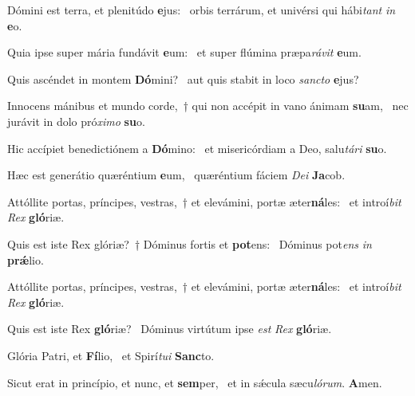 \item Dómini est terra, et plenitúdo \textbf{e}jus:~\psstar{} orbis terrárum, et univérsi qui hábi\textit{tant} \textit{in} \textbf{e}o.
\item Quia ipse super mária fundávit \textbf{e}um:~\psstar{} et super flúmina præpa\textit{rávit} \textbf{e}um.
\item Quis ascéndet in montem \textbf{Dó}mini?~\psstar{} aut quis stabit in loco \textit{sancto} \textbf{e}jus?
\item Innocens mánibus et mundo corde,~† qui non accépit in vano ánimam \textbf{su}am,~\psstar{} nec jurávit in dolo pró\textit{ximo} \textbf{su}o.
\item Hic accípiet benedictiónem a \textbf{Dó}mino:~\psstar{} et misericórdiam a Deo, salu\textit{tári} \textbf{su}o.
\item Hæc est generátio quæréntium \textbf{e}um,~\psstar{} quæréntium fáciem \textit{Dei} \textbf{Ja}cob.
\item Attóllite portas, príncipes, vestras,~† et elevámini, portæ æter\textbf{ná}les:~\psstar{} et introí\textit{bit} \textit{Rex} \textbf{gló}riæ.
\item Quis est iste Rex glóriæ?~† Dóminus fortis et \textbf{pot}ens:~\psstar{} Dóminus pot\textit{ens} \textit{in} \textbf{prǽ}lio.
\item Attóllite portas, príncipes, vestras,~† et elevámini, portæ æter\textbf{ná}les:~\psstar{} et introí\textit{bit} \textit{Rex} \textbf{gló}riæ.
\item Quis est iste Rex \textbf{gló}riæ?~\psstar{} Dóminus virtútum ipse \textit{est} \textit{Rex} \textbf{gló}riæ.
\item Glória Patri, et \textbf{Fí}lio,~\psstar{} et Spirí\textit{tui} \textbf{Sanc}to.
\item Sicut erat in princípio, et nunc, et \textbf{sem}per,~\psstar{} et in sǽcula sæcu\textit{lórum}. \textbf{A}men.

